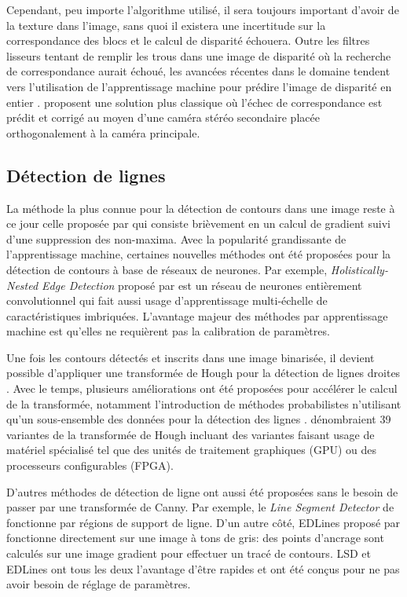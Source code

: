 Cependant, peu importe l'algorithme utilisé, il sera toujours important d'avoir de la texture dans l'image, sans quoi il existera une incertitude sur la correspondance des blocs et le calcul de disparité échouera. Outre les filtres lisseurs tentant de remplir les trous dans une image de disparité où la recherche de correspondance aurait échoué, les avancées récentes dans le domaine tendent vers l'utilisation de l'apprentissage machine pour prédire l'image de disparité en entier \citep{Kendall_2017_ICCV}. \cite{meier2017real} proposent une solution plus classique où l'échec de correspondance est prédit et corrigé au moyen d'une caméra stéréo secondaire placée orthogonalement à la caméra principale.

\subsection{Détection de lignes}

La méthode la plus connue pour la détection de contours dans une image reste à ce jour celle proposée par \cite{Canny1986} qui consiste brièvement en un calcul de gradient suivi d'une suppression des non-maxima. Avec la popularité grandissante de l'apprentissage machine, certaines nouvelles méthodes ont été proposées pour la détection de contours à base de réseaux de neurones. Par exemple, \textit{Holistically-Nested Edge Detection} proposé par \cite{Xie2015} est un réseau de neurones entièrement convolutionnel qui fait aussi usage d'apprentissage multi-échelle de caractéristiques imbriquées. L'avantage majeur des méthodes par apprentissage machine est qu'elles ne requièrent pas la calibration de paramètres.

Une fois les contours détectés et inscrits dans une image binarisée, il devient possible d'appliquer une transformée de Hough pour la détection de lignes droites \citep{Duda1972}. Avec le temps, plusieurs améliorations ont été proposées pour accélérer le calcul de la transformée, notamment l'introduction de méthodes probabilistes n'utilisant qu'un sous-ensemble des données pour la détection des lignes \citep{Matas2000}. \cite{Herout2013} dénombraient 39 variantes de la transformée de Hough incluant des variantes faisant usage de matériel spécialisé tel que des unités de traitement graphiques (GPU) ou des processeurs configurables (FPGA).

D'autres méthodes de détection de ligne ont aussi été proposées sans le besoin de passer par une transformée de Canny. Par exemple, le \textit{Line Segment Detector} de \cite{Gioi2012lsd} fonctionne par régions de support de ligne. D'un autre côté, EDLines proposé par \cite{AKINLAR20111633} fonctionne directement sur une image à tons de gris: des points d'ancrage sont calculés sur une image gradient pour effectuer un tracé de contours. LSD et EDLines ont tous les deux l'avantage d'être rapides et ont été conçus pour ne pas avoir besoin de réglage de paramètres.

